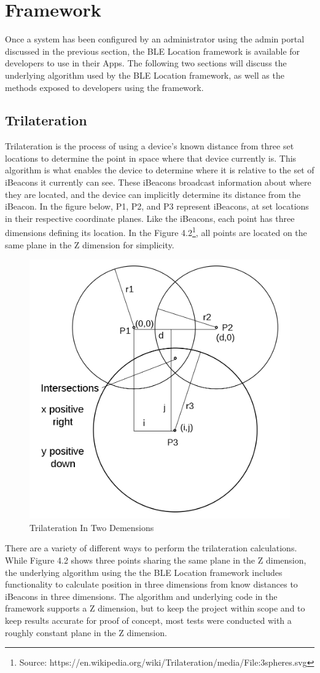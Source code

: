 \section{Framework}
Once a system has been configured by an administrator using the admin portal discussed in the previous section, the BLE Location framework is available for developers to use in their Apps.  The following two sections will discuss the underlying algorithm used by the BLE Location framework, as well as the methods exposed to developers using the framework.
\subsection{Trilateration}
Trilateration is the process of using a device's known distance from three set locations to determine the point in space where that device currently is.  This algorithm is what enables the device to determine where it is relative to the set of iBeacons it currently can see.  These iBeacons broadcast information about where they are located, and the device can implicitly determine its distance from the iBeacon.  In the figure below, P1, P2, and P3 represent iBeacons, at set locations in their respective coordinate planes.  Like the iBeacons, each point has three dimensions defining its location.  In the Figure 4.2\footnote{Source: https://en.wikipedia.org/wiki/Trilateration/media/File:3spheres.svg}, all points are located on the same plane in the Z dimension for simplicity.
\begin{figure}[h]
\centering
\includegraphics[width=.55\textwidth]{images/tri.png}
\caption{Trilateration In Two Demensions}
\end{figure}

There are a variety of different ways to perform the trilateration calculations.  While Figure 4.2 shows three points sharing the same plane in the Z dimension, the underlying algorithm using the the BLE Location framework includes functionality to calculate position in three dimensions from know distances to iBeacons in three dimensions.  The algorithm and underlying code in the framework supports a Z dimension, but to keep the project within scope and to keep results accurate for proof of concept, most tests were conducted with a roughly constant plane in the Z dimension.

